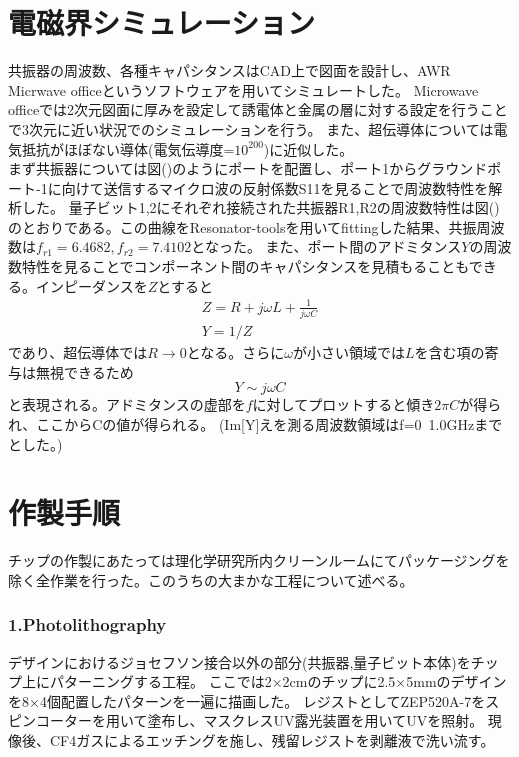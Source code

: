 \section{電磁界シミュレーション}共振器の周波数、各種キャパシタンスはCAD上で図面を設計し、AWR Micrwave officeというソフトウェアを用いてシミュレートした。
Microwave officeでは2次元図面に厚みを設定して誘電体と金属の層に対する設定を行うことで3次元に近い状況でのシミュレーションを行う。
また、超伝導体については電気抵抗がほぼない導体(電気伝導度=$10^{200}$)に近似した。\\
まず共振器については図()のようにポートを配置し、ポート1からグラウンドポート-1に向けて送信するマイクロ波の反射係数S11を見ることで周波数特性を解析した。
量子ビット1,2にそれぞれ接続された共振器R1,R2の周波数特性は図()のとおりである。この曲線をResonator-toolsを用いてfittingした結果、共振周波数は$f_{r1}=6.4682,f_{r2}=7.4102$となった。
また、ポート間のアドミタンス$Y$の周波数特性を見ることでコンポーネント間のキャパシタンスを見積もることもできる。インピーダンスを$Z$とすると
\begin{equation}
\begin{aligned}
    Z = R + j\omega L + \frac{1}{j\omega C} \\
    Y = 1/Z
\end{aligned}
\end{equation}
であり、超伝導体では$R \to 0$となる。さらに$\omega$が小さい領域では$L$を含む項の寄与は無視できるため
\begin{equation}
        Y \sim j\omega C
\end{equation}
と表現される。アドミタンスの虚部を$f$に対してプロットすると傾き$2\pi C$が得られ、ここからCの値が得られる。
(Im[Y]えを測る周波数領域はf=0~1.0GHzまでとした。)
\section{作製手順}
チップの作製にあたっては理化学研究所内クリーンルームにてパッケージングを除く全作業を行った。このうちの大まかな工程について述べる。
\subsubsection{1.Photolithography}
デザインにおけるジョセフソン接合以外の部分(共振器,量子ビット本体)をチップ上にパターニングする工程。
ここでは2×2cmのチップに2.5×5mmのデザインを8×4個配置したパターンを一遍に描画した。
レジストとしてZEP520A-7をスピンコーターを用いて塗布し、マスクレスUV露光装置を用いてUVを照射。
現像後、CF4ガスによるエッチングを施し、残留レジストを剥離液で洗い流す。
